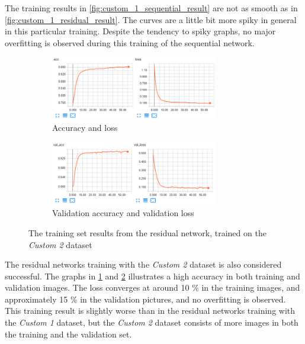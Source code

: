 \documentclass[USenglish]{ifimaster}  %
\begin{document}
The training results in \cref{fig:custom_1_sequential_result} are not as smooth as in \cref{fig:custom_1_residual_result}. The curves are a little bit more spiky in general in this particular training. Despite the tendency to spiky graphs, no major overfitting is observed during this training of the sequential network. 

\begin{figure}[H]
\centering
\begin{subfigure}[b]{\textwidth}
\centering
\includegraphics[width=0.8\textwidth]{bilder/custom_2_training/Custom_2_residual_training_acc_results.png}
\caption{Accuracy and loss}
\label{fig:custom_2_residual_acc_result}
\end{subfigure}
\hfill
\begin{subfigure}[b]{\textwidth}
\centering
\includegraphics[width=0.8\textwidth]{bilder/custom_2_training/Custom_2_residual_training_val_acc_results.png}
\caption{Validation accuracy and validation loss}
\label{fig:custom_2_residual_val_acc_result}
\end{subfigure}
\caption{The training set results from the residual network, trained on the \textit{Custom 2} dataset}
\label{fig:custom_2_residual_result}
\end{figure}

The residual networks training with the \textit{Custom 2} dataset is also considered successful. The graphs in \cref{fig:custom_2_residual_acc_result} and \cref{fig:custom_2_residual_val_acc_result} illustrates a high accuracy in both training and validation images. The loss converges at around 10 \% in the training images, and approximately 15 \% in the validation pictures, and no overfitting is observed. This training result is slightly worse than in the residual networks training with the \textit{Custom 1} dataset, but the \textit{Custom 2} dataset consists of more images in both the training and the validation set.
\end{document}
